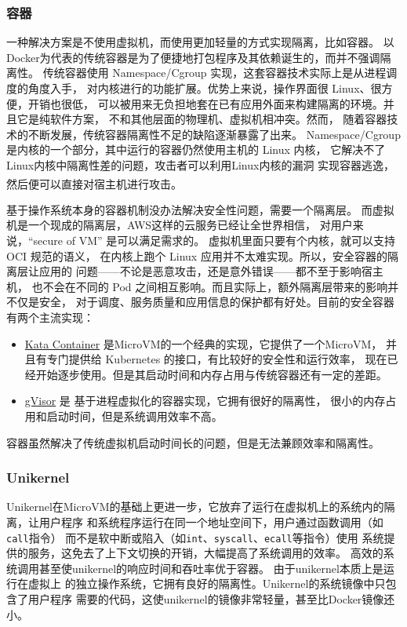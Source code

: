 \documentclass[UTF8,fontset=none,linespread=1.15]{ctexart}
\let\nosupcite\cite
\renewcommand*{\cite}[1]{\textsuperscript{\nosupcite{#1}}}
\begin{document}
\subsubsection{容器}
一种解决方案是不使用虚拟机，而使用更加轻量的方式实现隔离，比如容器。
以Docker为代表的传统容器是为了便捷地打包程序及其依赖诞生的，而并不强调隔离性。
传统容器使用 Namespace/Cgroup 实现，这套容器技术实际上是从进程调度的角度入手，
对内核进行的功能扩展。优势上来说，操作界面很 Linux、很方便，开销也很低，
可以被用来无负担地套在已有应用外面来构建隔离的环境。并且它是纯软件方案，
不和其他层面的物理机、虚拟机相冲突。然而，
随着容器技术的不断发展，传统容器隔离性不足的缺陷逐渐暴露了出来。
Namespace/Cgroup 是内核的一个部分，其中运行的容器仍然使用主机的 Linux 内核，
它解决不了Linux内核中隔离性差的问题，攻击者可以利用Linux内核的漏洞
实现容器逃逸，然后便可以直接对宿主机进行攻击。\cite{bib:docker-security-selinux}

基于操作系统本身的容器机制没办法解决安全性问题，需要一个隔离层。
而虚拟机是一个现成的隔离层，AWS这样的云服务已经让全世界相信，
对用户来说，“secure of VM” 是可以满足需求的。
虚拟机里面只要有个内核，就可以支持 OCI 规范的语义，
在内核上跑个 Linux 应用并不太难实现。所以，安全容器的隔离层让应用的
问题——不论是恶意攻击，还是意外错误——都不至于影响宿主机，
也不会在不同的 Pod 之间相互影响。而且实际上，额外隔离层带来的影响并不仅是安全，
对于调度、服务质量和应用信息的保护都有好处。目前的安全容器有两个主流实现：
\begin{itemize}
\item \href{https://github.com/kata-containers/kata-containers}{Kata Container} 是MicroVM的一个经典的实现，它提供了一个MicroVM，
并且有专门提供给 Kubernetes 的接口，有比较好的安全性和运行效率，
现在已经开始逐步使用。但是其启动时间和内存占用与传统容器还有一定的差距。
\item  \href{https://github.com/google/gvisor}{gVisor} 是
基于进程虚拟化的容器实现，它拥有很好的隔离性，
很小的内存占用和启动时间，但是系统调用效率不高。
\end{itemize}

容器虽然解决了传统虚拟机启动时间长的问题，但是无法兼顾效率和隔离性。

\subsubsection{Unikernel}
Unikernel在MicroVM的基础上更进一步，它放弃了运行在虚拟机上的系统内的隔离，让用户程序
和系统程序运行在同一个地址空间下，用户通过函数调用（如\texttt{call}指令）
而不是软中断或陷入（如\texttt{int}、\texttt{syscall}、\texttt{ecall}等指令）使用
系统提供的服务，这免去了上下文切换的开销，大幅提高了系统调用的效率。
高效的系统调用甚至使unikernel的响应时间和吞吐率优于容器。
由于unikernel本质上是运行在虚拟上
的独立操作系统，它拥有良好的隔离性。Unikernel的系统镜像中只包含了用户程序
需要的代码，这使unikernel的镜像非常轻量，甚至比Docker镜像还小。
\end{document}
